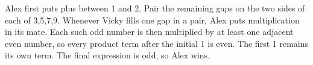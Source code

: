 Alex first puts plus between 1 and 2. Pair the remaining gaps on the two sides of each of 3,5,7,9. Whenever Vicky fills one gap in a pair, Alex puts multiplication in its mate. Each such odd number is then multiplied by at least one adjacent even number, so every product term after the initial 1 is even. The first 1 remains its own term. The final expression is odd, so $\boxed{\text{Alex wins}}$.
